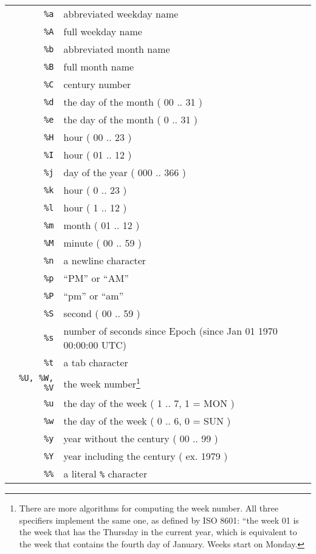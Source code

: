 \documentclass[a4paper,10pt]{article}
\begin{document}
\begin{tabular}{ r l }
\\
\texttt{\%a} & abbreviated weekday name \\
\texttt{\%A} & full weekday name \\
\texttt{\%b} & abbreviated month name \\
\texttt{\%B} & full month name \\
\texttt{\%C} & century number \\
\texttt{\%d} & the day of the month ( 00 .. 31 ) \\
\texttt{\%e} & the day of the month ( 0 .. 31 ) \\
\texttt{\%H} & hour ( 00 .. 23 ) \\
\texttt{\%I} & hour ( 01 .. 12 ) \\
\texttt{\%j} & day of the year ( 000 .. 366 ) \\
\texttt{\%k} & hour ( 0 .. 23 ) \\
\texttt{\%l} & hour ( 1 .. 12 ) \\
\texttt{\%m} & month ( 01 .. 12 ) \\
\texttt{\%M} & minute ( 00 .. 59 ) \\
\texttt{\%n} & a newline character \\
\texttt{\%p} & ``PM'' or ``AM'' \\
\texttt{\%P} & ``pm'' or ``am'' \\
\texttt{\%S} & second ( 00 .. 59 ) \\
\texttt{\%s} & number of seconds since Epoch (since Jan 01 1970 00:00:00 UTC) \\
\texttt{\%t} & a tab character \\
\texttt{\%U, \%W, \%V} & the week number\footnote{There are more algorithms for
computing the week number.  All three specifiers implement the same one, as
defined by ISO 8601: ``the week 01 is the week that has the Thursday in the
current year, which is equivalent to the week that contains the fourth day of
January.  Weeks start on Monday.}\\
\texttt{\%u} & the day of the week ( 1 .. 7, 1 = MON )\\
\texttt{\%w} & the day of the week ( 0 .. 6, 0 = SUN )\\
\texttt{\%y} & year without the century ( 00 .. 99 )\\
\texttt{\%Y} & year including the century ( ex. 1979 )\\
\texttt{\%\%} & a literal \texttt{\%} character
\end{tabular}
\end{document}
